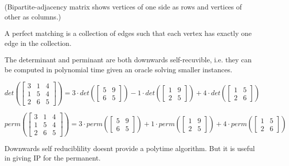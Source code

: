 \documentclass[a4paper,12pt]{article}
\theoremstyle{definition}
\theoremstyle{remark}
\begin{document}
(Bipartite-adjacency matrix shows vertices of one side as rows and vertices of other as columns.)

A perfect matching is a collection of edges such that each vertex has exactly one edge in the collection.

The determinant and perminant are both downwards self-recuvible, i.e. they can be computed in polynomial time
given an oracle solving smaller instances.

\begin{equation*}
    det(\begin{bmatrix}
        3 & 1 & 4 \\
        1 & 5 & 4 \\
        2 & 6 & 5
    \end{bmatrix})
    =
    3 \cdot det(\begin{bmatrix}
        5 & 9 \\
        6 & 5
    \end{bmatrix}) 
    - 1 \cdot det(\begin{bmatrix}
        1 & 9 \\
        2 & 5
    \end{bmatrix})
    + 4 \cdot det(\begin{bmatrix}
        1 & 5 \\
        2 & 6
    \end{bmatrix})
\end{equation*}

\begin{equation*}
    perm(\begin{bmatrix}
        3 & 1 & 4 \\
        1 & 5 & 4 \\
        2 & 6 & 5
    \end{bmatrix})
    =
    3 \cdot perm(\begin{bmatrix}
        5 & 9 \\
        6 & 5
    \end{bmatrix}) 
    + 1 \cdot perm(\begin{bmatrix}
        1 & 9 \\
        2 & 5
    \end{bmatrix})
    + 4 \cdot perm(\begin{bmatrix}
        1 & 5 \\
        2 & 6
    \end{bmatrix})
\end{equation*}

Downwards self reduciblility doesnt provide a polytime algorithm. But it is useful in giving IP for the permanent.
\end{document}
